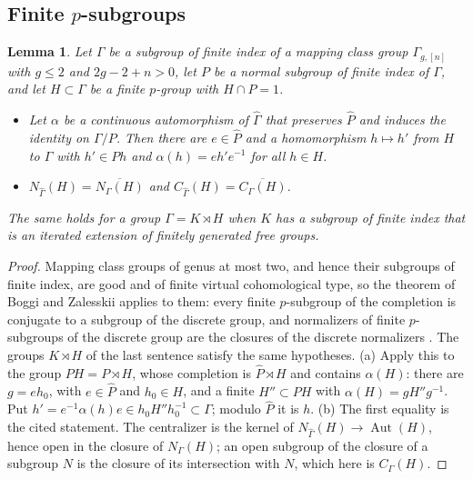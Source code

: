 \documentclass[11pt,a4paper]{article}
\theoremstyle{plain}
\newtheorem{lemma}[theorem]{Lemma}
\theoremstyle{definition}
\theoremstyle{remark}
\newcommand{\Aut}{\operatorname{Aut}}
\begin{document}
\subsection*{Finite $p$-subgroups}
\begin{lemma}\label{lem:BZ}
Let $\Gamma$ be a subgroup of finite index of a mapping class group $\Gamma_{g,[n]}$ with $g\le2$ and $2g-2+n>0$,
let $P$ be a normal subgroup of finite index of $\Gamma$, and let $H\subset\Gamma$ be a finite $p$-group with
$H\cap P=1$.
\begin{itemize}
\item[(a)] Let $\alpha$ be a continuous automorphism of $\widehat\Gamma$ that preserves $\widehat P$ and induces the
identity on $\Gamma/P$. Then there are $e\in\widehat P$ and a homomorphism $h\mapsto h'$ from $H$ to $\Gamma$ with
$h'\in Ph$ and $\alpha(h)=eh'e^{-1}$ for all $h\in H$.
\item[(b)] $N_{\widehat\Gamma}(H)=\overline{N_\Gamma(H)}$ and $C_{\widehat\Gamma}(H)=\overline{C_\Gamma(H)}$.
\end{itemize}
The same holds for a group $\Gamma=K\rtimes H$ when $K$ has a subgroup of finite index that is an iterated
extension of finitely generated free groups.
\end{lemma}

\begin{proof}
Mapping class groups of genus at most two, and hence their subgroups of finite index, are good and of finite
virtual cohomological type, so the theorem of Boggi and Zalesskii applies to them: every finite $p$-subgroup of the
completion is conjugate to a subgroup of the discrete group, and normalizers of finite $p$-subgroups of the
discrete group are the closures of the discrete normalizers \cite[Theorem A and the theorem on hyperelliptic
mapping class groups of the last section]{BZ}. The groups $K\rtimes H$ of the last sentence satisfy the same
hypotheses. (a) Apply this to the group $PH=P\rtimes H$, whose completion is $\widehat P\rtimes H$ and contains
$\alpha(H)$: there are $g=e h_0$, with $e\in\widehat P$ and $h_0\in H$, and a finite $H''\subset PH$ with
$\alpha(H)=gH''g^{-1}$. Put $h'=e^{-1}\alpha(h)e\in h_0H''h_0^{-1}\subset\Gamma$; modulo $\widehat P$ it is $h$.
(b) The first equality is the cited statement. The centralizer is the kernel of
$N_{\widehat\Gamma}(H)\to\Aut(H)$, hence open in the closure of $N_\Gamma(H)$; an open subgroup of the closure of a
subgroup $N$ is the closure of its intersection with $N$, which here is $C_\Gamma(H)$.
\end{proof}
\end{document}
